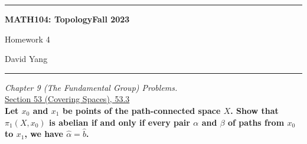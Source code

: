\documentclass[11pt]{article}
\begin{document}
	\hrule
	\begin{center}
        \textbf{MATH104: Topology}\hfill \textbf{Fall 2023}\newline

		{\Large Homework 4}

		David Yang
	\end{center}

\hrule

\vspace{1em}

\textit{Chapter 9 (The Fundamental Group) Problems.} \\

\underline{Section 53 (Covering Spaces), 53.3} \\

\textbf{Let $x_0$ and $x_1$ be points of the path-connected space $X$. Show that $\pi_1(X, x_0)$ is abelian if and only if every pair
$\alpha$ and $\beta$ of paths from $x_0$ to $x_1$, we have $\hat{\alpha} = \hat{b}$.}
\end{document}
